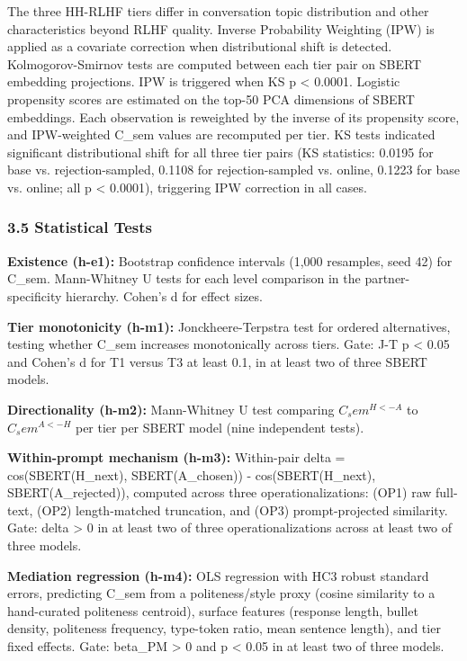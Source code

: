 The three HH-RLHF tiers differ in conversation topic distribution and other characteristics beyond RLHF quality. Inverse Probability Weighting (IPW) is applied as a covariate correction when distributional shift is detected. Kolmogorov-Smirnov tests are computed between each tier pair on SBERT embedding projections. IPW is triggered when KS p < 0.0001. Logistic propensity scores are estimated on the top-50 PCA dimensions of SBERT embeddings. Each observation is reweighted by the inverse of its propensity score, and IPW-weighted C\_sem values are recomputed per tier. KS tests indicated significant distributional shift for all three tier pairs (KS statistics: 0.0195 for base vs. rejection-sampled, 0.1108 for rejection-sampled vs. online, 0.1223 for base vs. online; all p < 0.0001), triggering IPW correction in all cases.

\subsubsection{3.5 Statistical Tests}

\textbf{Existence (h-e1):} Bootstrap confidence intervals (1,000 resamples, seed 42) for C\_sem. Mann-Whitney U tests for each level comparison in the partner-specificity hierarchy. Cohen's d for effect sizes.

\textbf{Tier monotonicity (h-m1):} Jonckheere-Terpstra test for ordered alternatives, testing whether C\_sem increases monotonically across tiers. Gate: J-T p < 0.05 and Cohen's d for T1 versus T3 at least 0.1, in at least two of three SBERT models.

\textbf{Directionality (h-m2):} Mann-Whitney U test comparing $C_sem^{H<-A}$ to $C_sem^{A<-H}$ per tier per SBERT model (nine independent tests).

\textbf{Within-prompt mechanism (h-m3):} Within-pair delta = cos(SBERT(H\_next), SBERT(A\_chosen)) - cos(SBERT(H\_next), SBERT(A\_rejected)), computed across three operationalizations: (OP1) raw full-text, (OP2) length-matched truncation, and (OP3) prompt-projected similarity. Gate: delta > 0 in at least two of three operationalizations across at least two of three models.

\textbf{Mediation regression (h-m4):} OLS regression with HC3 robust standard errors, predicting C\_sem from a politeness/style proxy (cosine similarity to a hand-curated politeness centroid), surface features (response length, bullet density, politeness frequency, type-token ratio, mean sentence length), and tier fixed effects. Gate: beta\_PM > 0 and p < 0.05 in at least two of three models.

